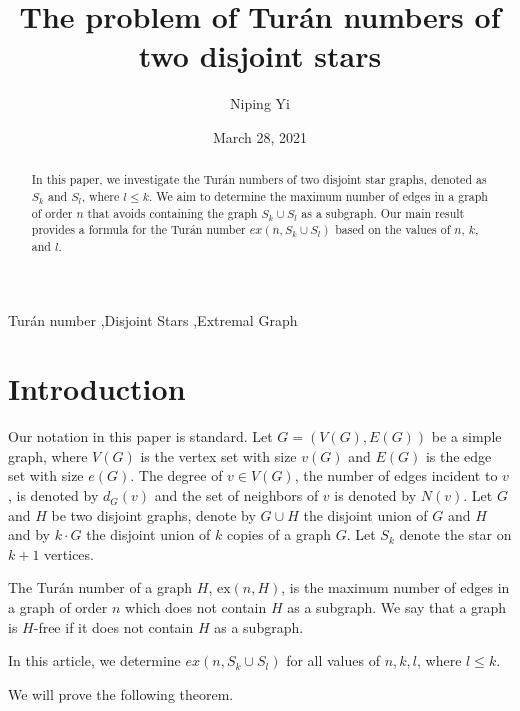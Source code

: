 \documentclass[12pt]{elsarticle}
\begin{document}
\begin{frontmatter}

\title{The problem of Turán numbers of two disjoint stars }

\author{Niping Yi}
\date{March 28, 2021}



\begin{abstract}
    In this paper, we investigate the Turán numbers of two disjoint star graphs, denoted as \( S_k \) and \( S_l \), where \( l \le k \). We aim to determine the maximum number of edges in a graph of order \( n \) that avoids containing the graph \( S_k \cup S_l \) as a subgraph. Our main result provides a formula for the Turán number \( ex(n, S_k \cup S_l) \) based on the values of \( n \), \( k \), and \( l \).  
    \end{abstract}

\begin{keyword}
Turán number \sep Disjoint Stars \sep Extremal Graph
\end{keyword}

\end{frontmatter}

\section{Introduction}
Our notation in this paper is standard. Let \( G = (V(G), E(G)) \) be a simple graph, where \( V(G) \) is the vertex set with size \( v(G) \) and \( E(G) \) is the edge set with size \( e(G) \). The degree of \( v \in V(G) \), the number of edges incident to \( v \), is denoted by \( d_G(v) \) and the set of neighbors of \( v \) is denoted by \( N(v) \).  Let \( G \) and \( H \) be two disjoint graphs, denote by \( G \cup H \) the disjoint union of \( G \) and \( H \) and by \( k \cdot G \) the disjoint union of \( k \) copies of a graph \( G \). Let \( S_k \) denote the star on \( k + 1 \) vertices. 

The Turán number of a graph \( H \), \( \text{ex}(n, H) \), is the maximum number of edges in a graph of order \( n \) which does not contain \( H \) as a subgraph. We say that a graph is \( H \)-free if it does not contain \( H \) as a subgraph.

In this article, we determine \( ex(n, S_k \cup S_l) \) for all values of \( n, k, l \), where \( l \le k \).


We will prove the following theorem.
\end{document}
